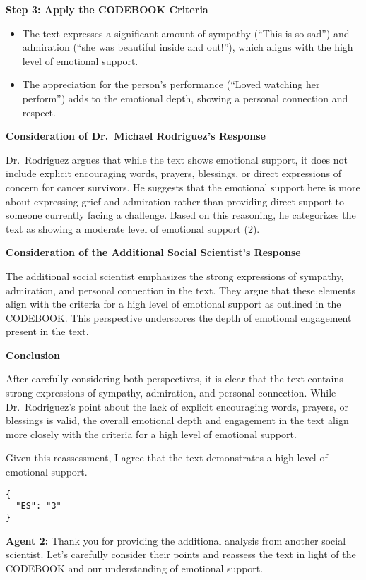 \textbf{Step 3: Apply the CODEBOOK Criteria}

\begin{itemize}
\tightlist
\item
  The text expresses a significant amount of sympathy (``This is so
  sad'') and admiration (``she was beautiful inside and out!''), which
  aligns with the high level of emotional support.
\item
  The appreciation for the person's performance (``Loved watching her
  perform'') adds to the emotional depth, showing a personal connection
  and respect.
\end{itemize}

\textbf{Consideration of Dr.~Michael Rodriguez's Response}

Dr.~Rodriguez argues that while the text shows emotional support, it
does not include explicit encouraging words, prayers, blessings, or
direct expressions of concern for cancer survivors. He suggests that the
emotional support here is more about expressing grief and admiration
rather than providing direct support to someone currently facing a
challenge. Based on this reasoning, he categorizes the text as showing a
moderate level of emotional support (2).

\textbf{Consideration of the Additional Social Scientist's Response}

The additional social scientist emphasizes the strong expressions of
sympathy, admiration, and personal connection in the text. They argue
that these elements align with the criteria for a high level of
emotional support as outlined in the CODEBOOK. This perspective
underscores the depth of emotional engagement present in the text.

\textbf{Conclusion}

After carefully considering both perspectives, it is clear that the text
contains strong expressions of sympathy, admiration, and personal
connection. While Dr.~Rodriguez's point about the lack of explicit
encouraging words, prayers, or blessings is valid, the overall emotional
depth and engagement in the text align more closely with the criteria
for a high level of emotional support.

Given this reassessment, I agree that the text demonstrates a high level
of emotional support.

\begin{verbatim}
{
  "ES": "3"
}
\end{verbatim}

\textbf{Agent 2:} Thank you for providing the additional analysis from another
social scientist. Let's carefully consider their points and reassess the
text in light of the CODEBOOK and our understanding of emotional
support.

